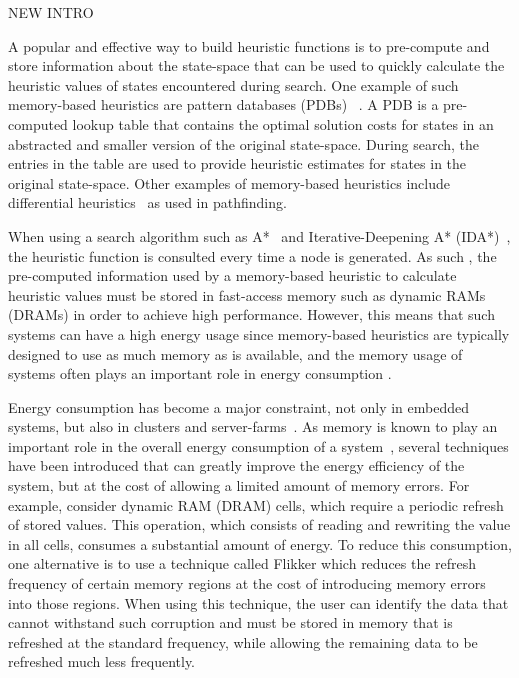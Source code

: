 
NEW INTRO

A popular and effective way to build heuristic functions is to pre-compute and store information about the state-space that can be used to quickly calculate the heuristic values of states encountered during search. One example of such memory-based heuristics are pattern databases (PDBs) ~\cite{culberson1998patternDatabases,Edelkamp01planningwith}. A PDB is a pre-computed lookup table that contains the optimal solution costs for states in an abstracted and smaller version of the original state-space. During search, the entries in the table are used to provide heuristic estimates for states in the original state-space. Other examples of memory-based heuristics include differential heuristics~\cite{stutervant2009memoryBased} as used in pathfinding. %

When using a search algorithm such as A*~\cite{hart1968aFormalBasis} and Iterative-Deepening A* (IDA*)~\cite{korf85}, the heuristic function is consulted every time a node is generated. As such , the pre-computed information used by a memory-based heuristic to calculate heuristic values must be stored in fast-access memory such as dynamic RAMs (DRAMs) in order to achieve high performance. However, this means that such systems can have a high energy usage since memory-based heuristics are typically designed to use as much memory as is available, and the memory usage of systems often plays an important role in energy consumption \cite{5695550}.

Energy consumption has become a major constraint, not only in embedded systems, but also in clusters and server-farms~\cite{Cameron2005}. As memory is known to play an important role in the overall energy consumption of a system~\cite{5695550}, several techniques have been introduced that can greatly improve the energy efficiency of the system, but at the cost of allowing a limited amount of memory errors. For example, consider dynamic RAM (DRAM) cells, which require a periodic refresh of stored values. This operation, which consists of reading and rewriting the value in all cells, consumes a substantial amount of energy. To reduce this consumption, one alternative is to use a technique called Flikker
\cite{Liu:2011:FSD:1950365.1950391} which reduces the refresh frequency of certain memory regions at the cost of introducing memory errors into those regions. When using this technique, the user can identify the data that cannot withstand such corruption and must be stored in memory that is refreshed at the standard frequency, while allowing the remaining data to be refreshed much less frequently. 

